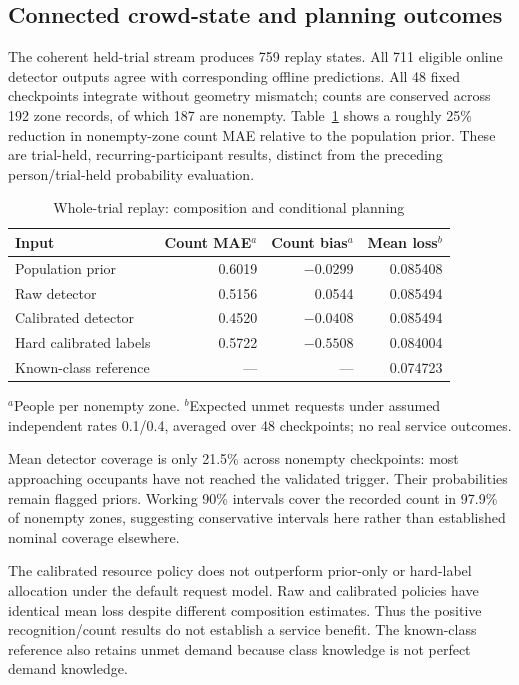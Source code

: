 \documentclass[conference]{IEEEtran}
\begin{document}
\subsection{Connected crowd-state and planning outcomes}
The coherent held-trial stream produces 759 replay states. All 711 eligible online detector outputs agree with corresponding offline predictions. All 48 fixed checkpoints integrate without geometry mismatch; counts are conserved across 192 zone records, of which 187 are nonempty. Table~\ref{tab:composition} shows a roughly 25\% reduction in nonempty-zone count MAE relative to the population prior. These are trial-held, recurring-participant results, distinct from the preceding person/trial-held probability evaluation.

\begin{table}[t]\centering\small\setlength{\tabcolsep}{4pt}
\caption{Whole-trial replay: composition and conditional planning}\label{tab:composition}
\begin{tabular}{lrrr}\toprule Input & Count MAE$^a$ & Count bias$^a$ & Mean loss$^b$\\\midrule
Population prior & 0.6019 & $-0.0299$ & 0.085408\\
Raw detector & 0.5156 & 0.0544 & 0.085494\\
Calibrated detector & 0.4520 & $-0.0408$ & 0.085494\\
Hard calibrated labels & 0.5722 & $-0.5508$ & 0.084004\\
Known-class reference & --- & --- & 0.074723\\\bottomrule
\end{tabular}
\par\smallskip\raggedright\footnotesize $^a$People per nonempty zone. $^b$Expected unmet requests under assumed independent rates 0.1/0.4, averaged over 48 checkpoints; no real service outcomes.
\end{table}

Mean detector coverage is only 21.5\% across nonempty checkpoints: most approaching occupants have not reached the validated trigger. Their probabilities remain flagged priors. Working 90\% intervals cover the recorded count in 97.9\% of nonempty zones, suggesting conservative intervals here rather than established nominal coverage elsewhere.

The calibrated resource policy does not outperform prior-only or hard-label allocation under the default request model. Raw and calibrated policies have identical mean loss despite different composition estimates. Thus the positive recognition/count results do not establish a service benefit. The known-class reference also retains unmet demand because class knowledge is not perfect demand knowledge.
\end{document}
